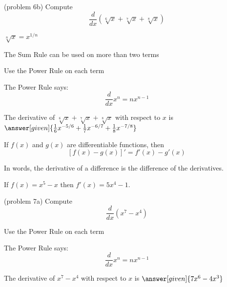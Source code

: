 \documentclass{ximera}
\begin{document}
\begin{problem}(problem 6b)
  Compute 
  \[
  \frac{d}{dx} \left(\sqrt[6] x + \sqrt[7] x + \sqrt[8] x\right)
  \]
  
    \begin{hint}
		 $\sqrt[n] x = x^{1/n}$
		\end{hint}
		\begin{hint}
		  The Sum Rule can be used on more than two terms
		\end{hint}
		\begin{hint}
      Use the Power Rule on each term
    \end{hint}
    \begin{hint}
      The Power Rule says:
      \[
      \frac{d}{dx} x^n = nx^{n-1}
      \]
    \end{hint}    
		The derivative of $\sqrt[6] x + \sqrt[7] x + \sqrt[8] x$ with respect to $x$ is
		 $\answer[given]{\frac16 x^{-5/6} + \frac17 x^{-6/7} + \frac18 x^{-7/8}}$
	
\end{problem}




\begin{theorem} If $f(x)$ and $g(x)$ are differentiable functions, then
\[ [f(x) - g(x)]' =  f'(x) -  g'(x)\]
\end{theorem}

In words, the derivative of a difference is the difference of the derivatives.\\



\begin{example}[example 7]
 If $f(x) = x^5 - x$ then $f'(x) = 5x^4 - 1$.
\end{example}

\begin{problem}(problem 7a)
  Compute 
  \[
  \frac{d}{dx} \left(x^7 - x^4\right)
  \]
  
    \begin{hint}
      Use the Power Rule on each term
    \end{hint}
    \begin{hint}
      The Power Rule says:
      \[
      \frac{d}{dx} x^n = nx^{n-1}
      \]
    \end{hint}    
		The derivative of $x^7 - x^4$ with respect to $x$ is
		 $\answer[given]{7x^6 - 4x^3}$
	
\end{problem}
\end{document}
